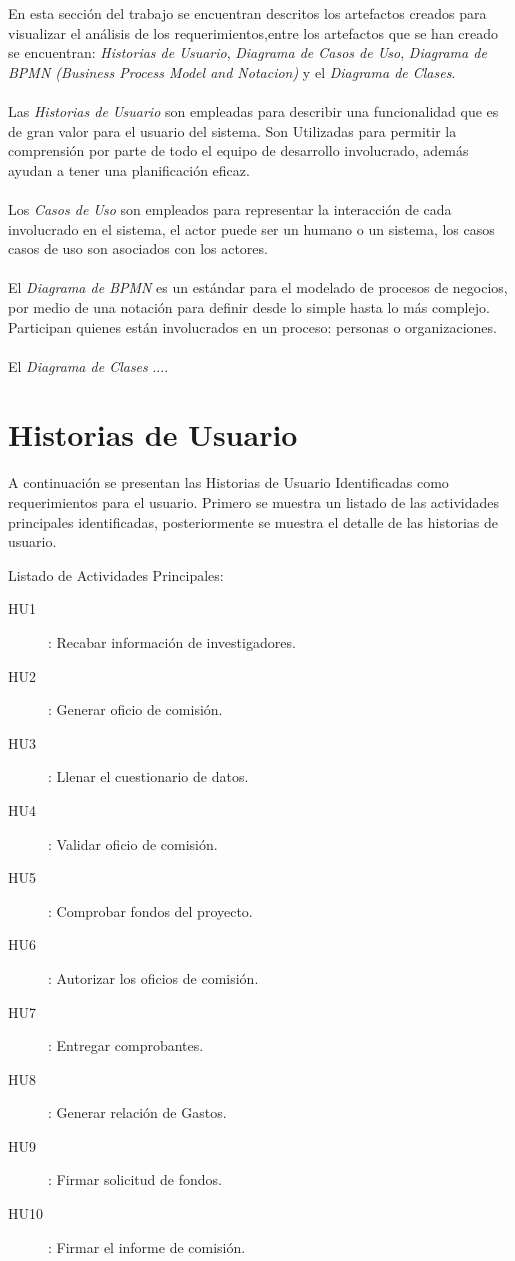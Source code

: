 \documentclass{report}
\begin{document}
    En esta sección del trabajo se encuentran descritos los artefactos creados para visualizar el análisis de los requerimientos,entre los artefactos que se han creado se encuentran: \emph{Historias de Usuario}, \emph{Diagrama de Casos de Uso}, \emph{Diagrama de BPMN (Business Process Model and Notacion)} y el \emph{Diagrama de Clases}.\\\\
    Las \emph{Historias de Usuario} son empleadas para describir una funcionalidad que es de gran valor para el usuario del sistema. Son Utilizadas para permitir la comprensión por parte de todo el equipo de desarrollo involucrado, además ayudan a tener una planificación eficaz.\\\\
    Los \emph{Casos de Uso} son empleados para representar la  interacción de cada involucrado en el sistema, el actor puede ser un humano o un sistema, los casos casos de uso son asociados con los actores.\\\\
    El \emph{Diagrama de BPMN} es un estándar para el modelado de procesos de negocios, por medio de una notación para definir desde lo simple hasta lo más complejo. Participan quienes están involucrados en un proceso: personas o organizaciones.\\\\
    El \emph{Diagrama de Clases} ....
    
    \section{Historias de Usuario}\label{HU}
    A continuación se presentan las Historias de Usuario Identificadas como requerimientos para el usuario. Primero se muestra un listado de las actividades principales identificadas, posteriormente se muestra el detalle de las historias de usuario.
    
    Listado de Actividades Principales:
    \begin{description}
        \item[HU1]: Recabar información de investigadores.
        \item[HU2]: Generar oficio de comisión.
        \item[HU3]: Llenar el cuestionario de datos.
        \item[HU4]: Validar oficio de comisión.
        \item[HU5]: Comprobar fondos del proyecto.
        \item[HU6]: Autorizar los oficios de comisión.
        \item[HU7]: Entregar comprobantes.
        \item[HU8]: Generar relación de Gastos.
        \item[HU9]: Firmar solicitud de fondos.
        \item[HU10]: Firmar el informe de comisión.
    \end{description}
    
\end{document}
